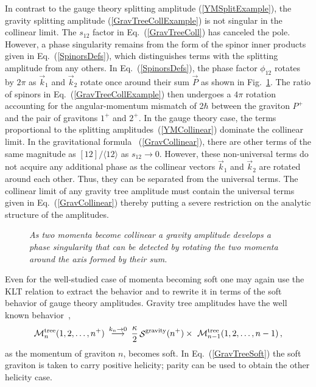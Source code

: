 In contrast to the gauge theory splitting amplitude
(\ref{YMSplitExample}), the gravity splitting amplitude
(\ref{GravTreeCollExample}) is not singular in the collinear limit.
The $s_{12}$ factor in Eq.~(\ref{GravTreeColl}) has canceled the
pole. However, a phase singularity remains from the form of the spinor
inner products given in Eq.~(\ref{SpinorsDefs}), which distinguishes
terms with the splitting amplitude from any others.  In
Eq.~(\ref{SpinorsDefs}), the phase factor $\phi_{12}$ rotates by
$2\pi$ as $\vec k_1$ and $\vec k_2$ rotate once around their sum $\vec
P$ as shown in Fig.~\ref{figure:RotCol}.  The ratio of spinors in
Eq.~(\ref{GravTreeCollExample}) then undergoes a $4\pi$ rotation
accounting for the angular-momentum mismatch of 2$\hbar$ between the
graviton $P^+$ and the pair of gravitons $1^+$ and $2^+$.  In the gauge
theory case, the terms proportional to the splitting
amplitudes~(\ref{YMCollinear}) dominate the collinear limit.
In the gravitational formula ~(\ref{GravCollinear}),
there are other terms of the same magnitude as $[{1}{2}]/
\langle{1}{2}\rangle$ as $s_{12} \to 0$. However, these non-universal
terms do not acquire any additional phase as the collinear vectors
$\vec k_1$ and $\vec k_2$ are rotated around each other. Thus, they
can be separated from the universal terms.  The collinear limit of any
gravity tree amplitude must contain the universal terms given in
Eq.~(\ref{GravCollinear}) thereby putting a severe restriction on the
analytic structure of the amplitudes.


\begin{figure}[h]
  \def\epsfsize#1#2{0.6#1} \centerline{}
  \caption{\it As two momenta become collinear a gravity amplitude
  develops a phase singularity that can be detected by rotating
  the two momenta around the axis formed by their sum.}
  \label{figure:RotCol}
\end{figure}


Even for the well-studied case of momenta becoming soft one may again use
the KLT relation to extract the behavior and to rewrite it in terms of
the soft behavior of gauge theory amplitudes.  Gravity tree amplitudes
have the well known behavior~\cite{WeinbergSoftG},
%
\begin{equation}
{\cal M}_n^{\rm tree}(1,2,\ldots,n^+)\ \mathop{\longrightarrow}^{k_n\to0}\
   {\kappa\over2} \, {\mathop {\cal S} \nolimits}^{\rm gravity}(n^+) \times\ 
   {\cal M}_{n-1}^{\rm tree}(1,2,\ldots,n-1) \,,
\label{GravTreeSoft}
\end{equation}
%
as the momentum of graviton $n$, becomes soft.  In
Eq.~(\ref{GravTreeSoft}) the soft graviton is taken to carry positive
helicity; parity can be used to obtain the other helicity case. 


